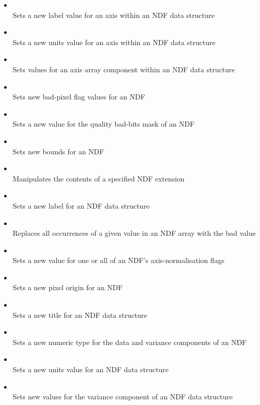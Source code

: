 \documentclass[twoside,11pt]{starlink}
\begin{document}
\begin{itemize}
\item{}\\
Sets a new label value for an axis within an NDF data structure
\item{}\\
Sets a new units value for an axis within an NDF data structure
\item{}\\
Sets values for an axis array component within an NDF data structure
\item{}\\
Sets new bad-pixel flag values for an NDF
\item{}\\
Sets a new value for the quality bad-bits mask of an NDF
\item{}\\
Sets new bounds for an NDF
\item{}\\
Manipulates the contents of a specified NDF extension
\item{}\\
Sets a new label for an NDF data structure
\item{}\\
Replaces all occurrences of a given value in an NDF array with the bad value
\item{}\\
Sets a new value for one or all of an NDF's axis-normalisation flags
\item{}\\
Sets a new pixel origin for an NDF
\item{}\\
Sets a new title for an NDF data structure
\item{}\\
Sets a new numeric type for the data and variance components of an NDF
\item{}\\
Sets a new units value for an NDF data structure
\item{}\\
Sets new values for the variance component of an NDF data structure
\end{itemize}
\end{document}
